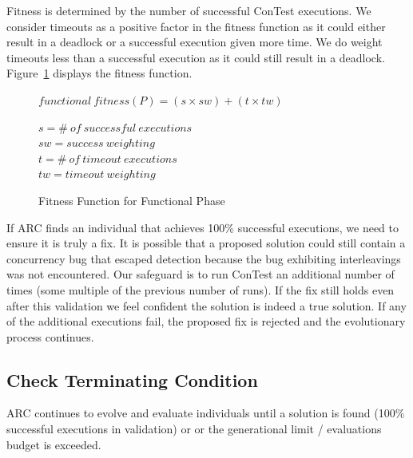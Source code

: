 \documentclass{llncs}
\begin{document}
Fitness is determined by the number of successful ConTest executions.
We consider timeouts as a positive
factor in the fitness function as it could either result in a deadlock or a
successful execution given more time. We do weight timeouts less than a
successful execution as it could still result in a deadlock.
Figure~\ref{fig:functional_fitness} displays the fitness function.

\begin{figure}[h]
\begin{footnotesize}
\begin{center}
$functional\ fitness(P) = (s \times sw) + (t \times tw)$
\end{center}
\end{footnotesize}
\begin{scriptsize}
\begin{center}
$s = \#\ of\ successful\ executions$ \\
$sw = success\ weighting$ \\
$t = \#\ of\ timeout\ executions$ \\
$tw = timeout\ weighting$
\end{center}
\end{scriptsize}
\caption{Fitness Function for Functional Phase}
\label{fig:functional_fitness}
\end{figure}

If ARC finds an individual that achieves 100\% successful executions,
we need to ensure it is truly a fix. It is possible that a
proposed solution could still contain a concurrency bug that escaped detection
because the bug exhibiting interleavings was not encountered. Our safeguard is
to run ConTest an additional number of times (some multiple of the previous
number of runs). If the fix still holds even after this validation we feel
confident the solution is indeed a true solution. If any of the additional
executions fail, the proposed fix is rejected and the evolutionary process
continues.



\subsection{Check Terminating Condition}
\label{sec:check_terminating_condition}

ARC continues to evolve and evaluate individuals until
a solution is found (100\% successful executions in validation) or or the generational limit /
evaluations budget is exceeded.
\end{document}
